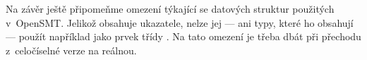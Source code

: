 Na závěr ještě připomeňme omezení týkající se datových struktur použitých v~OpenSMT. Jelikož  obsahuje ukazatele, nelze jej --- ani typy, které ho obsahují --- použít například jako prvek třídy . Na tato omezení je třeba dbát při přechodu z~celočíselné verze na reálnou.

